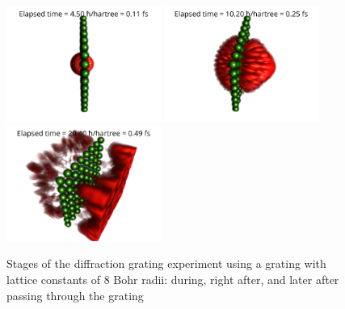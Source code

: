 \begin{figure}[hbtp!]
	\begin{center}
		\includegraphics[width=0.45\textwidth]{figures/optical_grid_8_bohr_rad_01.png}
		\includegraphics[width=0.45\textwidth]{figures/optical_grid_8_bohr_rad_02.png}
		\includegraphics[width=0.45\textwidth]{figures/optical_grid_8_bohr_rad_03.png}
		\caption{Stages of the diffraction grating experiment using a grating with lattice constants of $8$ Bohr radii: during, right after, and later after passing through the grating}
		\label{fig:optical_grid_stages_8_bohr_radii}
	\end{center}	
\end{figure}

